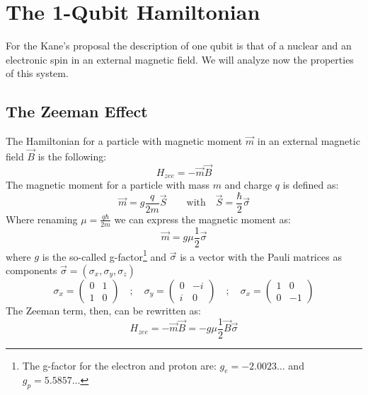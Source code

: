 \section{The 1-Qubit Hamiltonian}
For the Kane's proposal the description of one qubit is that of a nuclear and an electronic spin in an external magnetic field. We will analyze now the properties of this system.

\subsection{The Zeeman Effect}
The Hamiltonian for a particle with magnetic moment $\vec{m}$ in an external magnetic field $\vec{B}$ is the following:
\begin{equation}
  H_{zee} = -\vec{m}\vec{B}
\end{equation}
The magnetic moment for a particle with mass $m$ and charge $q$ is defined as:
\begin{equation*}
  \vec{m} = g\frac{q}{2m}\vec{S} \quad\quad\text{with}\quad \vec{S} =
  \frac{\hbar}{2}\vec{\sigma}
\end{equation*}
Where renaming $\mu = \frac{q\hbar}{2m}$ we can express the magnetic moment as:
\begin{equation}
  \vec{m} = g\mu\frac{1}{2}\vec{\sigma}
\label{magmom}
\end{equation}
where $g$ is the so-called g-factor\footnote{The g-factor for the electron and proton are: $g_e=-2.0023\dots$ and $g_p=5.5857\dots$} and $\vec{\sigma}$ is a vector with the Pauli matrices as components $\vec{\sigma}= \left(\sigma_x,\sigma_y,\sigma_z\right)$
\begin{equation}
  \sigma_x=\left(\begin{array}{cc}
    0 & 1 \\
    1 & 0
    \end{array}\right)\quad;\quad
  \sigma_y=\left(\begin{array}{cc}
    0 & -i \\
    i & 0
    \end{array}\right)\quad;\quad
  \sigma_x=\left(\begin{array}{cc}
    1 & 0 \\
    0 & -1
    \end{array}\right)
\end{equation}
The Zeeman term, then, can be rewritten as:
\begin{equation}
  H_{zee} = -\vec{m}\vec{B} = -g\mu\frac{1}{2}\vec{B}\vec{\sigma}
\end{equation}
